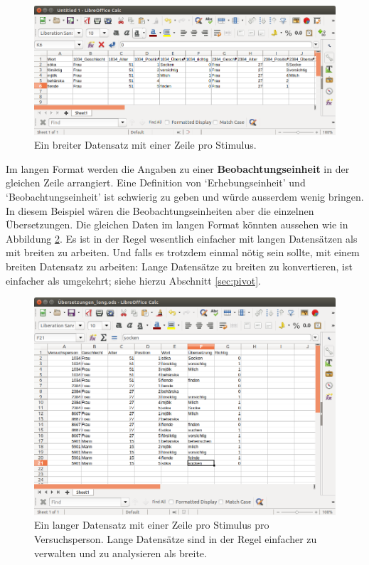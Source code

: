 \documentclass[oneside, 10pt]{book}\usepackage[]{graphicx}\usepackage[]{xcolor}
\begin{document}
\begin{figure}[tp]
\includegraphics[width = \textwidth]{figs/wide_data_item.png}
\caption{Ein breiter Datensatz mit einer Zeile pro Stimulus.}
\label{fig:wide_data_item}
\end{figure}

Im langen Format werden die Angaben zu einer \textbf{Beobachtungseinheit}
in der gleichen Zeile arrangiert. Eine Definition von `Erhebungseinheit'
und `Beobachtungseinheit' ist schwierig zu geben \citep[siehe][]{Wickham2014}
und würde ausserdem wenig bringen. In diesem Beispiel wären die 
Beobachtungseinheiten aber die einzelnen Übersetzungen. Die gleichen
Daten im langen Format könnten aussehen wie in Abbildung \ref{fig:long_data}.
Es ist in der Regel wesentlich einfacher mit langen Datensätzen als mit
breiten zu arbeiten. Und falls es trotzdem einmal nötig sein sollte, mit
einem breiten Datensatz zu arbeiten: Lange Datensätze zu breiten zu 
konvertieren, ist einfacher als umgekehrt; siehe hierzu Abschnitt \ref{sec:pivot}.

\begin{figure}[tp]
\includegraphics[width = \textwidth]{figs/long_data.png}
\caption{Ein langer Datensatz mit einer Zeile pro Stimulus pro Versuchsperson. Lange Datensätze sind in der Regel einfacher zu verwalten und zu analysieren als breite.}
\label{fig:long_data}
\end{figure}
\end{document}

